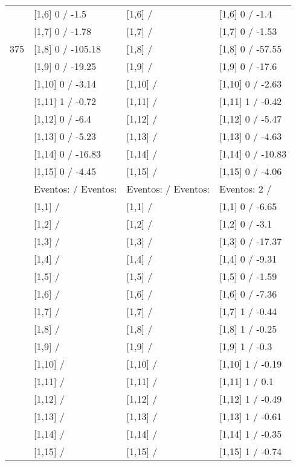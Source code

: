 \begin{table}
\begin{tabular}[t]{llll}
 & {}[1,6] 0  / -1.5 & {}[1,6]  / & {}[1,6] 0  / -1.4\\
 & {}[1,7] 0  / -1.78 & {}[1,7]  / & {}[1,7] 0  / -1.53\\
375 & {}[1,8] 0  / -105.18 & {}[1,8]  / & {}[1,8] 0  / -57.55\\
\addlinespace
 & {}[1,9] 0  / -19.25 & {}[1,9]  / & {}[1,9] 0  / -17.6\\
 & {}[1,10] 0  / -3.14 & {}[1,10]  / & {}[1,10] 0  / -2.63\\
 & {}[1,11] 1  / -0.72 & {}[1,11]  / & {}[1,11] 1  / -0.42\\
 & {}[1,12] 0  / -6.4 & {}[1,12]  / & {}[1,12] 0  / -5.47\\
 & {}[1,13] 0  / -5.23 & {}[1,13]  / & {}[1,13] 0  / -4.63\\
\addlinespace
 & {}[1,14] 0  / -16.83 & {}[1,14]  / & {}[1,14] 0  / -10.83\\
 & {}[1,15] 0  / -4.45 & {}[1,15]  / & {}[1,15] 0  / -4.06\\
 & Eventos:   / Eventos: & Eventos:   / Eventos: & Eventos:  2 /\\
 & {}[1,1]  / & {}[1,1]  / & {}[1,1] 0  / -6.65\\
 & {}[1,2]  / & {}[1,2]  / & {}[1,2] 0  / -3.1\\
\addlinespace
 & {}[1,3]  / & {}[1,3]  / & {}[1,3] 0  / -17.37\\
 & {}[1,4]  / & {}[1,4]  / & {}[1,4] 0  / -9.31\\
 & {}[1,5]  / & {}[1,5]  / & {}[1,5] 0  / -1.59\\
 & {}[1,6]  / & {}[1,6]  / & {}[1,6] 0  / -7.36\\
 & {}[1,7]  / & {}[1,7]  / & {}[1,7] 1  / -0.44\\
\addlinespace
500 & {}[1,8]  / & {}[1,8]  / & {}[1,8] 1  / -0.25\\
 & {}[1,9]  / & {}[1,9]  / & {}[1,9] 1  / -0.3\\
 & {}[1,10]  / & {}[1,10]  / & {}[1,10] 1  / -0.19\\
 & {}[1,11]  / & {}[1,11]  / & {}[1,11] 1  / 0.1\\
 & {}[1,12]  / & {}[1,12]  / & {}[1,12] 1  / -0.49\\
\addlinespace
 & {}[1,13]  / & {}[1,13]  / & {}[1,13] 1  / -0.61\\
 & {}[1,14]  / & {}[1,14]  / & {}[1,14] 1  / -0.35\\
 & {}[1,15]  / & {}[1,15]  / & {}[1,15] 1  / -0.74\\
\bottomrule
\end{tabular}
\end{table}
